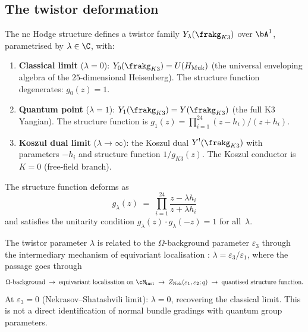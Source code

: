 \subsection{The twistor deformation}
\label{subsec:nc-hodge-twistor}

\begin{conjecture}
\label{conj:twistor-k3-yangian}
\ClaimStatusConjectured
The nc Hodge structure defines a twistor family
$Y_\lambda(\frakg_{K3})$ over $\bA^1$, parametrised by
$\lambda \in \C$, with:
\begin{enumerate}[label=(\roman*)]
 \item \textbf{Classical limit} ($\lambda = 0$):
 $Y_0(\frakg_{K3}) = U(H_{\mathrm{Muk}})$ (the universal
 enveloping algebra of the $25$-dimensional Heisenberg).
 The structure function degenerates: $g_0(z) = 1$.

 \item \textbf{Quantum point} ($\lambda = 1$):
 $Y_1(\frakg_{K3}) = Y(\frakg_{K3})$ (the full K3 Yangian).
 The structure function is
 $g_1(z) = \prod_{i=1}^{24}(z - h_i)/(z + h_i)$.

 \item \textbf{Koszul dual limit} ($\lambda \to \infty$):
 the Koszul dual $Y^!(\frakg_{K3})$ with parameters
 $-h_i$ and structure function $1/g_{K3}(z)$.
 The Koszul conductor is $K = 0$ (free-field branch).
\end{enumerate}
The structure function deforms as
\[
 g_\lambda(z) \;=\; \prod_{i=1}^{24}
 \frac{z - \lambda h_i}{z + \lambda h_i}
\]
and satisfies the unitarity condition $g_\lambda(z) \cdot
g_\lambda(-z) = 1$ for all~$\lambda$.
\end{conjecture}

\begin{remark}
\label{rem:twistor-omega}
The twistor parameter $\lambda$ is related to the
$\Omega$-background parameter $\varepsilon_3$ through the
intermediary mechanism of equivariant localisation
: $\lambda = \varepsilon_3 / \varepsilon_1$, where
the passage goes through
\[
 \Omega\text{-background} \;\to\;
 \text{equivariant localisation on } \cM_{\mathrm{inst}} \;\to\;
 Z_{\mathrm{Nek}}(\varepsilon_1, \varepsilon_2; q) \;\to\;
 \text{quantised structure function.}
\]
At $\varepsilon_3 = 0$ (Nekrasov--Shatashvili limit): $\lambda = 0$,
recovering the classical limit. This is not a direct identification
of normal bundle gradings with quantum group parameters.
\end{remark}

